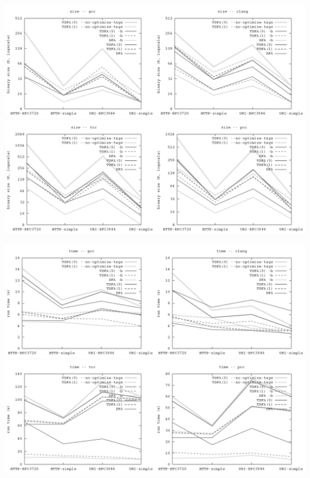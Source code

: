 \documentclass{article}
\newenvironment{Xfig}
    {\par\medskip\noindent\minipage{\linewidth}\begin{center}}
    {\end{center}\endminipage\par\medskip}
\theoremstyle{definition}
\begin{document}
\begin{Xfig}
\includegraphics[width=\linewidth]{img/bench/size_gcc_clang.png}
\includegraphics[width=\linewidth]{img/bench/size_tcc_pcc.png}
\end{Xfig}

\begin{Xfig}
\includegraphics[width=\linewidth]{img/bench/time_gcc_clang.png}
\includegraphics[width=\linewidth]{img/bench/time_tcc_pcc.png}
\end{Xfig}
\end{document}
